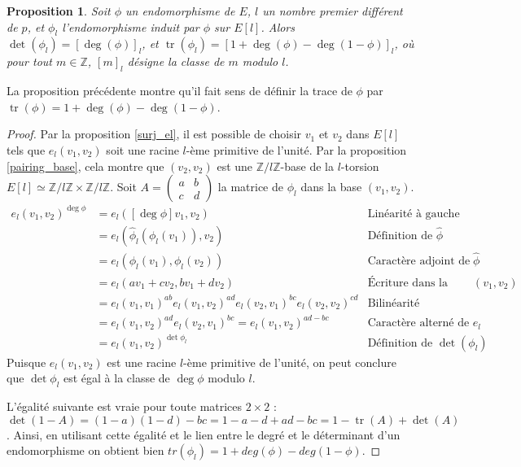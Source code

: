 \documentclass{article}
\theoremstyle{plain}%
\newtheorem{prop}[thm]{Proposition}
\theoremstyle{definition}%
\newcommand{\Z}{\mathbb{Z}}
\newcommand{\h}{\widehat}
\DeclareMathOperator{\tr}{tr}
\begin{document}
\begin{prop}
  \label{dettr}
  Soit $\phi$ un endomorphisme de $E$, $l$ un nombre premier différent de $p$, et $\phi_l$ l'endomorphisme induit par $\phi$ sur $E[l]$. Alors $\det(\phi_l) = [\deg(\phi)]_l$, et $\tr(\phi_l) = [1 + \deg(\phi) - \deg(1-\phi)]_l$, où pour tout $m\in\Z$, $[m]_l$ désigne la classe de $m$ modulo $l$. 
\end{prop}

La proposition précédente montre qu'il fait sens de définir la trace de $\phi$ par $\tr(\phi) = 1 + \deg(\phi) - \deg(1-\phi)$.

\begin{proof}
  Par la proposition \ref{surj_el}, il est possible de choisir $v_1$ et $v_2$ dans $E[l]$ tels que $e_l(v_1, v_2)$ soit une racine $l$-ème primitive de l'unité. Par la proposition \ref{pairing_base}, cela montre que $(v_2, v_2)$ est une $\Z/l\Z$-base de la $l$-torsion $E[l] \simeq \Z/l\Z\times\Z/l\Z$. 
  Soit $A = \begin{pmatrix} a & b \\ c & d \end{pmatrix}$ la matrice de $\phi_l$ dans la base $(v_1, v_2)$.
  \begin{align*}
  e_l(v_1, v_2)^{\deg\phi} 
  &= e_l([\deg\phi]v_1, v_2) & \text{Linéarité à gauche} \\
  &= e_l(\h\phi_l(\phi_l(v_1)), v_2) & \text{Définition de $\h\phi$} \\
  &= e_l(\phi_l(v_1), \phi_l(v_2)) & \text{Caractère adjoint de $\h\phi$} \\
  &= e_l(av_1+cv_2, bv_1+dv_2) & \text{Écriture dans la base $(v_1, v_2)$} \\
  &= e_l(v_1, v_1)^{ab} e_l(v_1, v_2)^{ad} e_l(v_2, v_1)^{bc} e_l(v_2, v_2)^{cd} & \text{Bilinéarité} \\
  &= e_l(v_1, v_2)^{ad} e_l(v_2, v_1)^{bc} = e_l(v_1, v_2)^{ad-bc} & \text{Caractère alterné de $e_l$} \\
  &= e_l(v_1, v_2)^{\det\phi_l} & \text{Définition de $\det(\phi_l)$}
  \end{align*}
  Puisque $e_l(v_1, v_2)$ est une racine $l$-ème primitive de l'unité, on peut conclure que $\det\phi_l$ est égal à la classe de $\deg\phi$ modulo $l$.

   L'égalité suivante est vraie pour toute matrices $2\times 2$ : $\det(1-A) = (1-a)(1-d) - bc = 1 -a -d + ad -bc = 1 - \tr(A) + \det(A)$. Ainsi, en utilisant cette égalité et le lien entre le degré et le déterminant d'un endomorphisme on obtient bien $tr(\phi_l) = 1 + deg(\phi) - deg(1-\phi)$.   
\end{proof}
\end{document}
